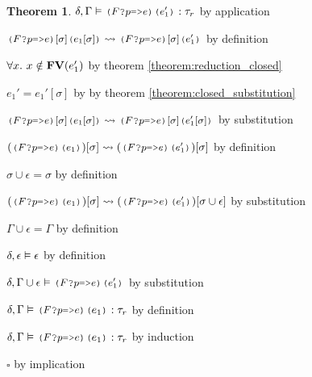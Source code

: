 \documentclass[acmsmall]{acmart}
\theoremstyle{definition}
\newtheorem{theorem}{Theorem}[section]
\begin{document}
\begin{theorem}
      \item \Z\Z $\delta, \Gamma \satisfies \J{($F$?$p$=>$e$)($e_1'$)} \hastype \tau_r$ by application
      \item \Z\Z $\J{($F$?$p$=>$e$)$[\sigma]$($e_1[\sigma]$)} \rightsquigarrow \J{($F$?$p$=>$e$)$[\sigma]$($e_1'$)}$ by definition 
      \item \Z\Z $\forall x .\ x \notin \textbf{FV}(e_1')$ by theorem \ref{theorem:reduction_closed} 
      \item \Z\Z $e_1' = e_1'[\sigma]$ by by theorem \ref{theorem:closed_substitution} 
      \item \Z\Z $\J{($F$?$p$=>$e$)$[\sigma]$($e_1[\sigma]$)} \rightsquigarrow \J{($F$?$p$=>$e$)$[\sigma]$($e_1'[\sigma]$)}$ by substitution 
      \item \Z\Z $(\J{($F$?$p$=>$e$)($e_1$)})[\sigma] \rightsquigarrow (\J{($F$?$p$=>$e$)($e_1'$)})[\sigma]$ by definition 
      \item \Z\Z $\sigma \cup \epsilon = \sigma$ by definition 
      \item \Z\Z $(\J{($F$?$p$=>$e$)($e_1$)})[\sigma] \rightsquigarrow (\J{($F$?$p$=>$e$)($e_1'$)})[\sigma \cup \epsilon]$ by substitution 
      \item \Z\Z $\Gamma \cup \epsilon = \Gamma$ by definition
      \item \Z\Z $\delta, \epsilon \vDash \epsilon$ by definition
      \item \Z\Z $\delta, \Gamma \cup \epsilon \satisfies \J{($F$?$p$=>$e$)($e_1'$)}$ by substitution 
      \item \Z\Z $\delta, \Gamma \satisfies \J{($F$?$p$=>$e$)}\J{(}e_1\J{)} \hastype \tau_r$ by definition
    \item \Z $\delta, \Gamma \satisfies \J{($F$?$p$=>$e$)}\J{(}e_1\J{)} \hastype \tau_r$ by induction
  \item $\square$ by implication 
\end{theorem}
\end{document}
